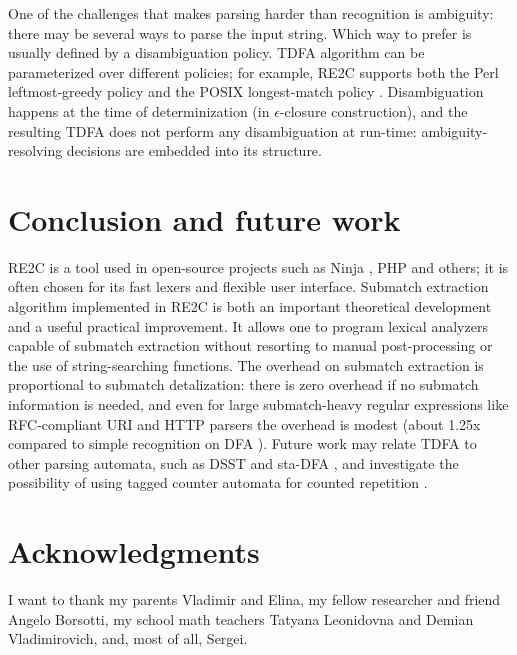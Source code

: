 \documentclass[preprint,12pt, a4paper]{elsarticle}
\begin{document}
\noindent
One of the challenges that makes parsing harder than recognition is ambiguity:
there may be several ways to parse the input string.
Which way to prefer is usually defined by a disambiguation policy.
TDFA algorithm can be parameterized over different policies;
for example, RE2C supports both the Perl leftmost-greedy policy and the POSIX longest-match policy \cite{BorTro19}.
Disambiguation happens at the time of determinization (in $\epsilon$-closure construction),
and the resulting TDFA does not perform any disambiguation at run-time: ambiguity-resolving decisions are embedded into its structure.

\section{Conclusion and future work}

\noindent
RE2C is a tool used in open-source projects such as Ninja \cite{Ninja}, PHP \cite{PHP} and others;
it is often chosen for its fast lexers and flexible user interface.
%
Submatch extraction algorithm implemented in RE2C
is both an important theoretical development and a useful practical improvement.
It allows one to program lexical analyzers capable of submatch extraction
without resorting to manual post-processing or the use of string-searching functions.
The overhead on submatch extraction is proportional to submatch detalization:
there is zero overhead if no submatch information is needed,
and even for large submatch-heavy regular expressions like RFC-compliant URI and HTTP parsers the overhead is modest
(about 1.25x compared to simple recognition on DFA \cite{Tro17}).
%
Future work may relate TDFA to other parsing automata, such as DSST \cite{Gra15} and sta-DFA \cite{Cho18},
and investigate the possibility of using tagged counter automata for counted repetition \cite{Bec09}.


\section*{Acknowledgments}
\label{}
\noindent
I want to thank my parents Vladimir and Elina,
my fellow researcher and friend Angelo Borsotti,
my school math teachers Tatyana Leonidovna and Demian Vladimirovich,
and, most of all, Sergei.
\end{document}

